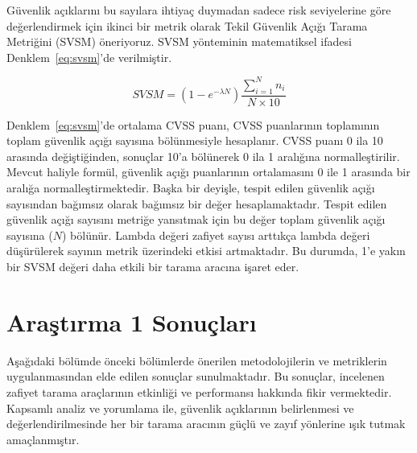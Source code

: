 Güvenlik açıklarını bu sayılara ihtiyaç duymadan sadece risk seviyelerine göre değerlendirmek için ikinci bir metrik olarak Tekil Güvenlik Açığı Tarama Metriğini (SVSM) öneriyoruz. SVSM yönteminin matematiksel ifadesi Denklem~\ref{eq:svsm}'de verilmiştir.

\begin{equation} \label{eq:svsm}
    SVSM = (1-e^{-\lambda N}) \frac{\sum_{i=1}^{N} n_i}{N \times 10}
\end{equation}

Denklem~\ref{eq:svsm}'de ortalama CVSS puanı, CVSS puanlarının toplamının toplam güvenlik açığı sayısına bölünmesiyle hesaplanır. CVSS puanı 0 ila 10 arasında değiştiğinden, sonuçlar 10'a bölünerek 0 ila 1 aralığına normalleştirilir. Mevcut haliyle formül, güvenlik açığı puanlarının ortalamasını 0 ile 1 arasında bir aralığa normalleştirmektedir. Başka bir deyişle, tespit edilen güvenlik açığı sayısından bağımsız olarak bağımsız bir değer hesaplamaktadır. Tespit edilen güvenlik açığı sayısını metriğe yansıtmak için bu değer toplam güvenlik açığı sayısına ($N$) bölünür. Lambda değeri zafiyet sayısı arttıkça lambda değeri düşürülerek sayının metrik üzerindeki etkisi artmaktadır. Bu durumda, 1'e yakın bir SVSM değeri daha etkili bir tarama aracına işaret eder.

\section{Araştırma 1 Sonuçları}\label{sec:sonuclar}

Aşağıdaki bölümde önceki bölümlerde önerilen metodolojilerin ve metriklerin uygulanmasından elde edilen sonuçlar sunulmaktadır. Bu sonuçlar, incelenen zafiyet tarama araçlarının etkinliği ve performansı hakkında fikir vermektedir. Kapsamlı analiz ve yorumlama ile, güvenlik açıklarının belirlenmesi ve değerlendirilmesinde her bir tarama aracının güçlü ve zayıf yönlerine ışık tutmak amaçlanmıştır.

